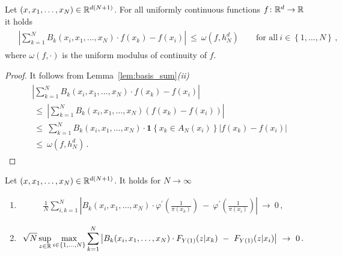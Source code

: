 \begin{lemma}
  \label{lem:basis_approx_f}
  Let $(x,x_1,\ldots,x_N)\in\mathbb{R}^{d(N+1)}$.
  For all uniformly continuous functions $f\colon \mathbb{R}^d\to \mathbb{R}$ it holds
 \begin{align*}
   \begin{split}
   &
   \left|
  \sum_{k=1}^{N}
    B_k(x_i,x_1,\ldots,x_N)\cdot 
    f(x_k)
    -
    f(x_i)
   \right|
   \ 
   \le
   \ 
   \omega
   \left(
    f,h_N^d
   \right)
   \qquad
   \text{for all}\ 
   i\in \left\{ 1,\ldots,N \right\}
   \,,
   \end{split}
 \end{align*}
 where $\omega(f,\cdot)$ is the uniform modulus of continuity of $f$. 
\end{lemma}
\begin{proof}
  It follows from Lemma~\ref{lem:basis_sum}\textit{(ii)}
  \begin{align*}
   \begin{split}
   &
   \left|
  \sum_{k=1}^{N}
    B_k(x_i,x_1,\ldots,x_N)\cdot 
    f(x_k)
    -
    f(x_i)
   \right|
   \\
   &
   \ 
   \le
   \ 
   \left|
  \sum_{k=1}^{N}
    B_k(x_i,x_1,\ldots,x_N)
    \left(
    f(x_k)
    -
    f(x_i)
    \right)
   \right|
   \\
   &
   \ 
   \le
   \ 
  \sum_{k=1}^{N}
    B_k(x_i,x_1,\ldots,x_N)
    \cdot
    \mathbf{1}\left\{
      x_k\in A_N(x_i)
    \right\}
    \left|
    f(x_k)
    -
    f(x_i)
    \right|
   \\
   &
   \ 
   \le
   \ 
   \omega
   \left(
    f,h_N^d
   \right)
   \,.
   \end{split}
 \end{align*}
\end{proof}
\begin{lemma}
  \label{lem:basis_2}
  Let $(x,x_1,\ldots,x_N)\in\mathbb{R}^{d(N+1)}$.
  It holds
  for $N\to\infty$
  \begin{enumerate}[label=(\roman*)]
      \item
      \begin{align*}
        \frac
        {1}
        {N}
        \sum_{i,k=1}^{N}
            \left|
        B_k(x_i,x_1,\ldots,x_N)
        \cdot
        \varphi^{'}
            \left(
              \frac
              {1}
              {\pi(x_k)}
            \right)
            \ 
            -
            \ 
            \varphi^{'}
            \left(
              \frac
              {1}
              {\pi(x_i)}
            \right)
            \right|
            \ 
            \to
            \ 
            0
            \,,
          \end{align*}
\item
      \begin{align*}
        \sqrt{N}
        \sup_{z\in\R}
        \max_{i\in \left\{ 1,\ldots,N \right\}}
        \sum_{k=1}^{N}
            \left|
        B_k(x_i,x_1,\ldots,x_N)
        \cdot
        F_{Y(1)}(z|x_k)
            \ 
            -
            \ 
        F_{Y(1)}(z|x_i)
            \right|
            \ 
            \to
            \ 
            0
            \,.
      \end{align*}
\end{enumerate}
\end{lemma}
